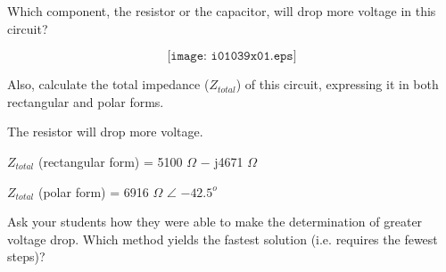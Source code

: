 

Which component, the resistor or the capacitor, will drop more voltage in this circuit?

$$\texttt{[image: i01039x01.eps]}$$

Also, calculate the total impedance ($Z_{total}$) of this circuit, expressing it in both rectangular and polar forms.







The resistor will drop more voltage.

\vskip 10pt

$Z_{total}$ (rectangular form) = 5100 $\Omega$ $-$ j4671 $\Omega$

\vskip 10pt

$Z_{total}$ (polar form) = 6916 $\Omega$ $\angle$ $-42.5^{o}$







Ask your students how they were able to make the determination of greater voltage drop.  Which method yields the fastest solution (i.e. requires the fewest steps)?




